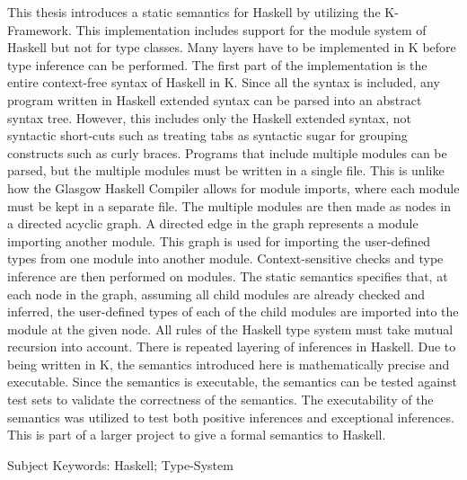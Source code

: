 This thesis introduces a static semantics for Haskell by utilizing the K-Framework. This implementation includes support for the module system of Haskell but not for type classes. Many layers have to be implemented in K before type inference can be performed. The first part of the implementation is the entire context-free syntax of Haskell in K. Since all the syntax is included, any program written in Haskell extended syntax can be parsed into an abstract syntax tree. However, this includes only the Haskell extended syntax, not syntactic short-cuts such as treating tabs as syntactic sugar for grouping constructs such as curly braces. Programs that include multiple modules can be parsed, but the multiple modules must be written in a single file. This is unlike how the Glasgow Haskell Compiler allows for module imports, where each module must be kept in a separate file. The multiple modules are then made as nodes in a directed acyclic graph. A directed edge in the graph represents a module importing another module. This graph is used for importing the user-defined types from one module into another module. Context-sensitive checks and type inference are then performed on modules. The static semantics specifies that, at each node in the graph, assuming all child modules are already checked and inferred, the user-defined types of each of the child modules are imported into the module at the given node. All rules of the Haskell type system must take mutual recursion into account. There is repeated layering of inferences in Haskell. Due to being written in K, the semantics introduced here is mathematically precise and executable. Since the semantics is executable, the semantics can be tested against test sets to validate the correctness of the semantics. The executability of the semantics was utilized to test both positive inferences and exceptional inferences. This is part of a larger project to give a formal semantics to Haskell.

Subject Keywords: Haskell; Type-System
